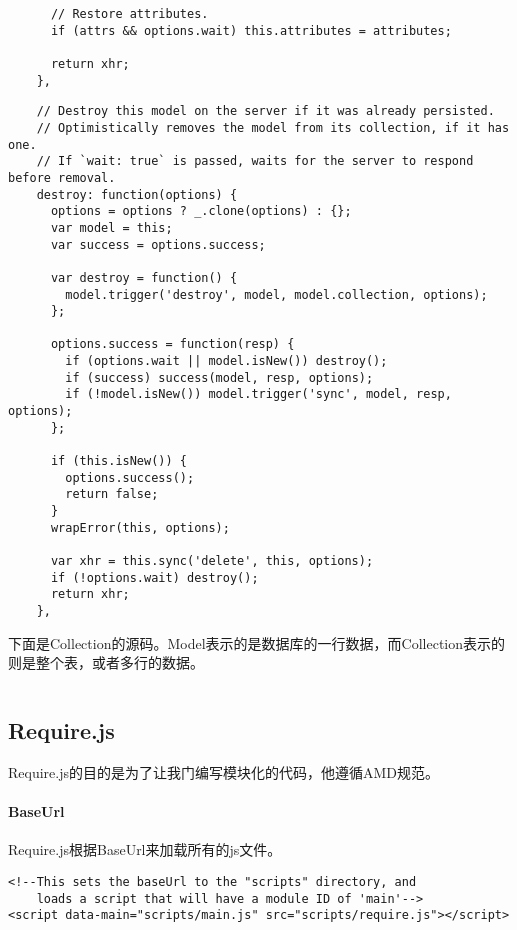 \documentclass[12pt, oneside, b5paper]{book}
\begin{document}
\begin{CJK}{UTF8}{gkai}
\begin{lstlisting}
      // Restore attributes.
      if (attrs && options.wait) this.attributes = attributes;

      return xhr;
    },
  \end{lstlisting}

  \begin{lstlisting}
    // Destroy this model on the server if it was already persisted.
    // Optimistically removes the model from its collection, if it has one.
    // If `wait: true` is passed, waits for the server to respond before removal.
    destroy: function(options) {
      options = options ? _.clone(options) : {};
      var model = this;
      var success = options.success;

      var destroy = function() {
        model.trigger('destroy', model, model.collection, options);
      };

      options.success = function(resp) {
        if (options.wait || model.isNew()) destroy();
        if (success) success(model, resp, options);
        if (!model.isNew()) model.trigger('sync', model, resp, options);
      };

      if (this.isNew()) {
        options.success();
        return false;
      }
      wrapError(this, options);

      var xhr = this.sync('delete', this, options);
      if (!options.wait) destroy();
      return xhr;
    },
  \end{lstlisting}

  下面是Collection的源码。Model表示的是数据库的一行数据，而Collection表示的则是整个表，或者多行的数据。
  \begin{lstlisting} 

  \end{lstlisting}

  \paragraph{}


	\subsection{Require.js}
	Require.js的目的是为了让我门编写模块化的代码，他遵循AMD规范。

	\paragraph{BaseUrl}
	Require.js根据BaseUrl来加载所有的js文件。

	\begin{lstlisting}
<!--This sets the baseUrl to the "scripts" directory, and
    loads a script that will have a module ID of 'main'-->
<script data-main="scripts/main.js" src="scripts/require.js"></script>
	\end{lstlisting}


\end{CJK}
\end{document}
